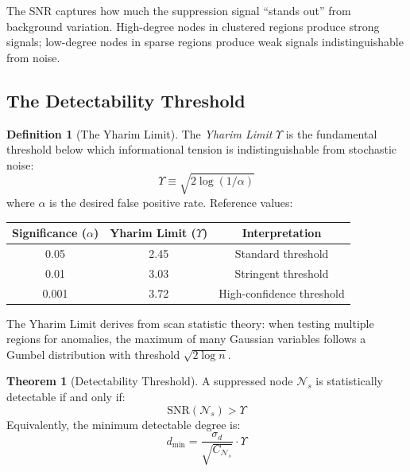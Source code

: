 \documentclass[11pt,a4paper]{article}
\theoremstyle{definition}
\newtheorem{definition}{Definition}[section]
\newtheorem{theorem}{Theorem}[section]
\theoremstyle{remark}
\newcommand{\NS}{\mathcal{N}_s}
\newcommand{\Yharim}{\Upsilon}
\begin{document}
The SNR captures how much the suppression signal ``stands out'' from background variation. High-degree nodes in clustered regions produce strong signals; low-degree nodes in sparse regions produce weak signals indistinguishable from noise.

\subsection{The Detectability Threshold}

\begin{definition}[The Yharim Limit]
\label{def:yharim}
The \emph{Yharim Limit} $\Yharim$ is the fundamental threshold below which informational tension is indistinguishable from stochastic noise:
\begin{equation}
    \boxed{
    \Yharim \equiv \sqrt{2 \log(1/\alpha)}
    }
\end{equation}
where $\alpha$ is the desired false positive rate. Reference values:
\begin{center}
\renewcommand{\arraystretch}{1.2}
\begin{tabular}{ccc}
\toprule
\textbf{Significance} ($\alpha$) & \textbf{Yharim Limit} ($\Yharim$) & \textbf{Interpretation} \\
\midrule
0.05 & 2.45 & Standard threshold \\
0.01 & 3.03 & Stringent threshold \\
0.001 & 3.72 & High-confidence threshold \\
\bottomrule
\end{tabular}
\end{center}
\end{definition}

The Yharim Limit derives from scan statistic theory: when testing multiple regions for anomalies, the maximum of many Gaussian variables follows a Gumbel distribution with threshold $\sqrt{2\log n}$.

\begin{theorem}[Detectability Threshold]
\label{thm:detectability}
A suppressed node $\NS$ is statistically detectable if and only if:
\begin{equation}
    \boxed{\text{SNR}(\NS) > \Yharim}
\end{equation}
Equivalently, the minimum detectable degree is:
\begin{equation}
    d_{\min} = \frac{\sigma_d}{\sqrt{C_{\NS}}} \cdot \Yharim
\end{equation}
\end{theorem}
\end{document}
